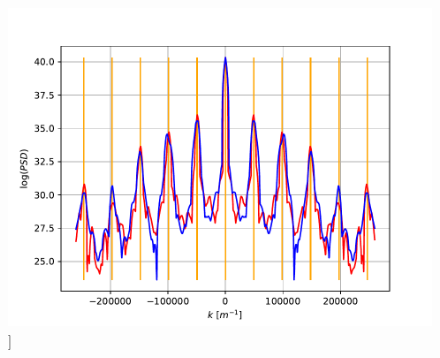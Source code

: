 \documentclass[pdftex,12pt,a4paper]{article}
\begin{document}
		\begin{figure}[H]
			\centering
			\includegraphics[scale=1]{./figs/1dpsd.pdf}]
			\caption{}
			\label{1dpsd}
		\end{figure}
	
    
\end{document}
